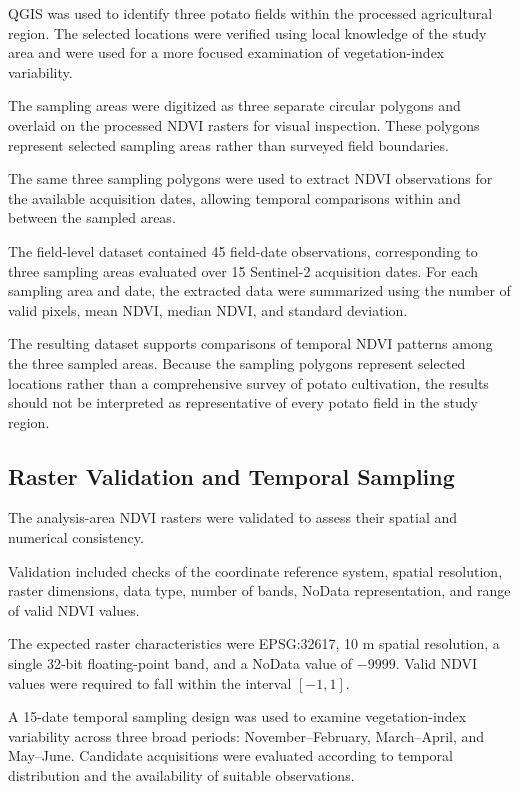 QGIS was used to identify three potato fields
within the processed agricultural region.
The selected locations were verified using
local knowledge of the study area and were
used for a more focused examination of
vegetation-index variability.

The sampling areas were digitized as three
separate circular polygons and overlaid on
the processed NDVI rasters for visual
inspection. These polygons represent
selected sampling areas rather than surveyed
field boundaries.

The same three sampling polygons were used
to extract NDVI observations for the available
acquisition dates, allowing temporal
comparisons within and between the sampled
areas.

The field-level dataset contained 45
field-date observations, corresponding to
three sampling areas evaluated over 15
Sentinel-2 acquisition dates. For each
sampling area and date, the extracted data
were summarized using the number of valid
pixels, mean NDVI, median NDVI, and standard
deviation.

The resulting dataset supports comparisons
of temporal NDVI patterns among the three
sampled areas. Because the sampling polygons
represent selected locations rather than
a comprehensive survey of potato cultivation,
the results should not be interpreted as
representative of every potato field in
the study region.


\subsection{Raster Validation and Temporal Sampling}
\label{subsec:raster-validation}

The analysis-area NDVI rasters were validated
to assess their spatial and numerical
consistency.

Validation included checks of the coordinate
reference system, spatial resolution, raster
dimensions, data type, number of bands,
NoData representation, and range of valid
NDVI values.

The expected raster characteristics were
EPSG:32617, 10 m spatial resolution, a single
32-bit floating-point band, and a NoData
value of $-9999$. Valid NDVI values were
required to fall within the interval $[-1,1]$.

A 15-date temporal sampling design was used
to examine vegetation-index variability across
three broad periods: November--February,
March--April, and May--June. Candidate
acquisitions were evaluated according to
temporal distribution and the availability
of suitable observations.

